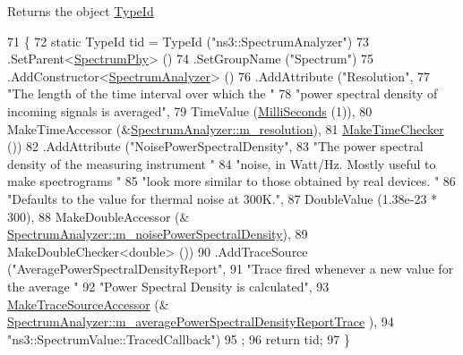 \begin{DoxyReturn}{Returns}
the object \hyperlink{classns3_1_1TypeId}{Type\+Id} 
\end{DoxyReturn}

\begin{DoxyCode}
71 \{
72   \textcolor{keyword}{static} TypeId tid = TypeId (\textcolor{stringliteral}{"ns3::SpectrumAnalyzer"})
73     .SetParent<\hyperlink{classns3_1_1SpectrumPhy_a207bd7373a9fd3b7f8d8e00380a0e7e4}{SpectrumPhy}> ()
74     .SetGroupName (\textcolor{stringliteral}{"Spectrum"})
75     .AddConstructor<\hyperlink{classns3_1_1SpectrumAnalyzer_a233bf0300a8b44edf2f4102df14bbd21}{SpectrumAnalyzer}> ()
76     .AddAttribute (\textcolor{stringliteral}{"Resolution"},
77                    \textcolor{stringliteral}{"The length of the time interval over which the "}
78                    \textcolor{stringliteral}{"power spectral density of incoming signals is averaged"},
79                    TimeValue (\hyperlink{group__timecivil_gaf26127cf4571146b83a92ee18679c7a9}{MilliSeconds} (1)),
80                    MakeTimeAccessor (&\hyperlink{classns3_1_1SpectrumAnalyzer_a4f5652202cd95f66b350caea4e76ff61}{SpectrumAnalyzer::m\_resolution}),
81                    \hyperlink{group__time_ga7032965bd4afa578691d88c09e4481c1}{MakeTimeChecker} ())
82     .AddAttribute (\textcolor{stringliteral}{"NoisePowerSpectralDensity"},
83                    \textcolor{stringliteral}{"The power spectral density of the measuring instrument "}
84                    \textcolor{stringliteral}{"noise, in Watt/Hz. Mostly useful to make spectrograms "}
85                    \textcolor{stringliteral}{"look more similar to those obtained by real devices. "}
86                    \textcolor{stringliteral}{"Defaults to the value for thermal noise at 300K."},
87                    DoubleValue (1.38e-23 * 300),
88                    MakeDoubleAccessor (&
      \hyperlink{classns3_1_1SpectrumAnalyzer_a152e578c6c71cbeb028868a6b13eeec8}{SpectrumAnalyzer::m\_noisePowerSpectralDensity}),
89                    MakeDoubleChecker<double> ())
90     .AddTraceSource (\textcolor{stringliteral}{"AveragePowerSpectralDensityReport"},
91                      \textcolor{stringliteral}{"Trace fired whenever a new value for the average "}
92                      \textcolor{stringliteral}{"Power Spectral Density is calculated"},
93                      \hyperlink{group__tracing_gab21a770b9855af4e8f69f7531ea4a6b0}{MakeTraceSourceAccessor} (&
      \hyperlink{classns3_1_1SpectrumAnalyzer_a014909438325c07fe2f55a027e3fde90}{SpectrumAnalyzer::m\_averagePowerSpectralDensityReportTrace}
      ),
94                      \textcolor{stringliteral}{"ns3::SpectrumValue::TracedCallback"})
95   ;
96   \textcolor{keywordflow}{return} tid;
97 \}
\end{DoxyCode}


